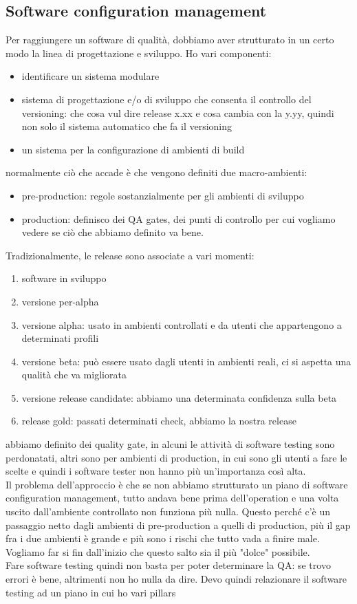 \documentclass{article}
\begin{document}
\subsection{Software configuration management}
Per raggiungere un software di qualità, dobbiamo aver strutturato in un certo modo la linea di progettazione e sviluppo. Ho vari componenti:
\begin{itemize}
\item identificare un sistema modulare
\item sistema di progettazione e/o di sviluppo che consenta il controllo del versioning: che cosa vul dire release x.xx e cosa cambia con la y.yy, quindi non solo il sistema automatico che fa il versioning
\item un sistema per la configurazione di ambienti di build
\end{itemize}
normalmente ciò che accade è che vengono definiti due macro-ambienti:
\begin{itemize}
\item pre-production: regole sostanzialmente per gli ambienti di sviluppo
\item production: definisco dei QA gates, dei punti di controllo per cui vogliamo vedere se ciò che abbiamo definito va bene.
\end{itemize}
Tradizionalmente, le release sono associate a vari momenti:
\begin{enumerate}
\item software in sviluppo
\item versione per-alpha
\item versione alpha: usato in ambienti controllati e da utenti che appartengono a determinati profili
\item versione beta: può essere usato dagli utenti in ambienti reali, ci si aspetta una qualità che va migliorata
\item versione release candidate: abbiamo una determinata confidenza sulla beta
\item release gold: passati determinati check, abbiamo la nostra release
\end{enumerate}
abbiamo definito dei quality gate, in alcuni le attività di software testing sono perdonatati, altri sono per ambienti di production, in cui sono gli utenti a fare le scelte e quindi i software tester non hanno più un'importanza così alta.\\ Il problema dell'approccio è che se non abbiamo strutturato un piano di software configuration management, tutto andava bene prima dell'operation e una volta uscito dall'ambiente controllato non funziona più nulla. Questo perché c'è un passaggio netto dagli ambienti di pre-production a quelli di production, più il gap fra i due ambienti è grande e più sono i rischi che tutto vada a finire male. Vogliamo far si fin dall'inizio che questo salto sia il più "dolce" possibile.\\
Fare software testing quindi non basta per poter determinare la QA: se trovo errori è bene, altrimenti non ho nulla da dire. Devo quindi relazionare il software testing ad un piano in cui ho vari pillars
\end{document}
